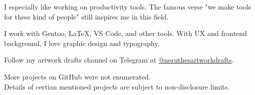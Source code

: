     \begin{minipage}[t]{50mm}
        \RaggedRight

        I especially like working on productivity tools.
        The famous verse "we make tools for these kind of people" still inspires me in this field.
    \end{minipage}
    \hfill
    \begin{minipage}[t]{50mm}
        \RaggedRight

        I work with Gentoo, \LaTeX, VS Code, and other tools.
        With UX and frontend background, I love graphic design and typography.
    \end{minipage}
    \hfill
    \begin{minipage}[t]{50mm}
        \RaggedRight

        Follow my artwork drafts channel on Telegram at \underline{@neruthesartworkdrafts}.
    \end{minipage}



    \vfill

    \begin{minipage}[t]{\textwidth}
        \footnotesize

        More projects on GitHub were not enumerated. \\
        Details of certian mentioned projects are subject to non-disclosure limits.
    \end{minipage}









